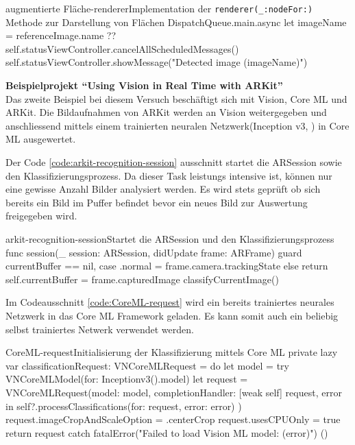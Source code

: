 \begin{description}
\begin{code}{augmentierte Fläche-renderer}{Implementation der \texttt{renderer(\_:nodeFor:)} Methode zur Darstellung von Flächen}
{			DispatchQueue.main.async {
				let imageName = referenceImage.name ?? 
				self.statusViewController.cancelAllScheduledMessages()
				self.statusViewController.showMessage("Detected image (imageName)")
			}
		}
	\end{code}


	\textbf{Beispielprojekt "`Using Vision in Real Time with ARKit"'} \\
	Das zweite Beispiel bei diesem Versuch beschäftigt sich mit Vision, Core ML und ARKit. Die Bildaufnahmen von ARKit werden an Vision weitergegeben und anschliessend mittels einem trainierten neuralen Netzwerk(Inception v3, \cite{DBLP:journals/corr/SzegedyVISW15}) in Core ML ausgewertet. 

	Der Code \ref{code:arkit-recognition-session} ausschnitt startet die ARSession sowie den Klassifizierungsprozess. Da dieser Task leistungs intensive ist, können nur eine gewisse Anzahl Bilder analysiert werden. Es wird stets geprüft ob sich bereits ein Bild im Puffer befindet bevor ein neues Bild zur Auswertung freigegeben wird.

	\begin{code}{arkit-recognition-session}{Startet die ARSession und den Klassifizierungsprozess}	
	func session(_ session: ARSession, didUpdate frame: ARFrame) {
		guard currentBuffer == nil, case .normal = frame.camera.trackingState else {
			return
		}
		self.currentBuffer = frame.capturedImage
		classifyCurrentImage()
	}
	\end{code}

	Im Codeausschnitt \ref{code:CoreML-request} wird ein bereits trainiertes neurales Netzwerk in das Core ML Framework geladen. Es kann somit auch ein beliebig selbst trainiertes Netwerk verwendet werden.
	\begin{code}{CoreML-request}{Initialisierung der Klassifizierung mittels Core ML}
	private lazy var classificationRequest: VNCoreMLRequest = {
		do {
			let model = try VNCoreMLModel(for: Inceptionv3().model)
			let request = VNCoreMLRequest(model: model, completionHandler: { [weak self] request, error in
				self?.processClassifications(for: request, error: error)
			})
			request.imageCropAndScaleOption = .centerCrop
			request.usesCPUOnly = true
			return request
		} catch {
			fatalError("Failed to load Vision ML model: (error)")
		}
	}()
	\end{code}


\end{description}
